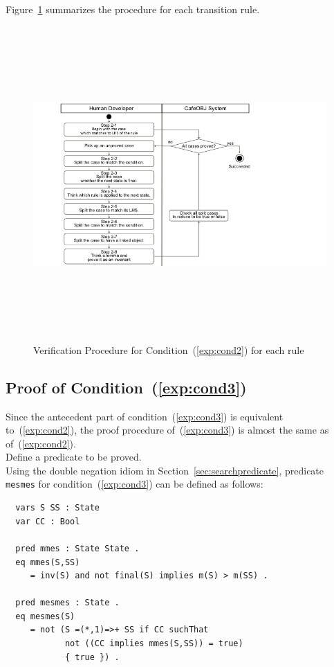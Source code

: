 \documentclass[12pt]{report}
\begin{document}
Figure~\ref{fig:procedure2} summarizes the procedure for each transition rule.
\begin{figure}
\centering
\includegraphics[height=12cm,natwidth=720,natheight=405,clip,trim=60 0 180 0]{procedure2.png}
\caption{Verification Procedure for Condition~(\ref{exp:cond2}) for each rule}
\label{fig:procedure2}
\end{figure}

\subsection{Proof of Condition~(\ref{exp:cond3})}
\label{sec:TOSCAmesmes}
Since the antecedent part of condition~(\ref{exp:cond3}) is equivalent
to~(\ref{exp:cond2}), the proof procedure of~(\ref{exp:cond3}) is
almost the same as of~(\ref{exp:cond2}). \\

 Define a predicate to be proved.\\ Using the
double negation idiom in Section~\ref{sec:searchpredicate}, predicate
{\tt mesmes} for condition~(\ref{exp:cond3}) can be defined as follows:
\small
\begin{verbatim}
  vars S SS : State
  var CC : Bool

  pred mmes : State State .
  eq mmes(S,SS)
     = inv(S) and not final(S) implies m(S) > m(SS) .

  pred mesmes : State .
  eq mesmes(S)
     = not (S =(*,1)=>+ SS if CC suchThat
            not ((CC implies mmes(S,SS)) = true)
            { true }) .
\end{verbatim}
\normalsize
\end{document}
